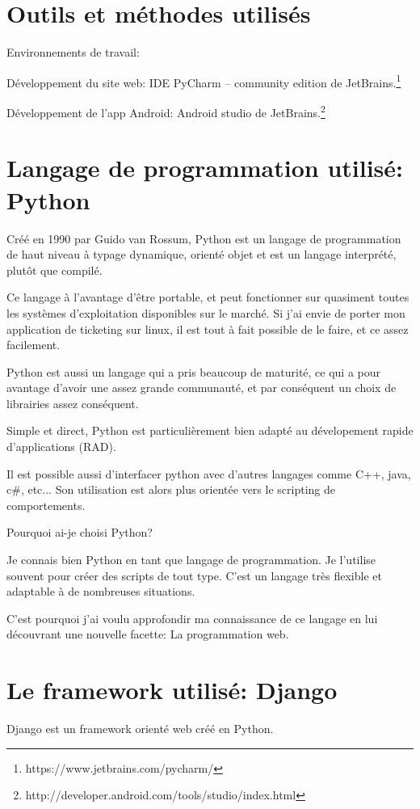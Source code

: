\documentclass[12pt,table,a4paper]{report}
\begin{document}
\section{Outils et méthodes utilisés}
Environnements de travail:

Développement du site web: IDE PyCharm – community edition de JetBrains.\footnote{https://www.jetbrains.com/pycharm/}

Développement de l'app Android: Android studio de JetBrains.\footnote{http://developer.android.com/tools/studio/index.html}

\section{Langage de programmation utilisé: Python}
Créé en 1990 par Guido van Rossum, Python est un langage de programmation de haut niveau à typage dynamique, orienté objet et est un langage interprété, plutôt que compilé.

Ce langage à l'avantage d'être portable, et peut fonctionner sur quasiment toutes les systèmes d'exploitation disponibles sur le marché. Si j'ai envie de porter mon application de ticketing sur linux, il est tout à fait possible de le faire, et ce assez facilement.

Python est aussi un langage qui a pris beaucoup de maturité, ce qui a pour avantage d'avoir une assez grande communauté, et par conséquent un choix de librairies assez conséquent.

Simple et direct, Python est particulièrement bien adapté au dévelopement rapide d'applications (RAD).

Il est possible aussi d'interfacer python avec d'autres langages comme C++, java, c\#, etc... Son utilisation est alors plus orientée vers le scripting de comportements.

Pourquoi ai-je choisi Python? 

Je connais bien Python en tant que langage de programmation. Je l'utilise souvent pour créer des scripts de tout type. C'est un langage très flexible et adaptable à de nombreuses situations.

C'est pourquoi j'ai voulu approfondir ma connaissance de ce langage en lui découvrant une nouvelle facette: La programmation web.

\section{Le framework utilisé: Django}
Django est un framework orienté web créé en Python.
\end{document}
